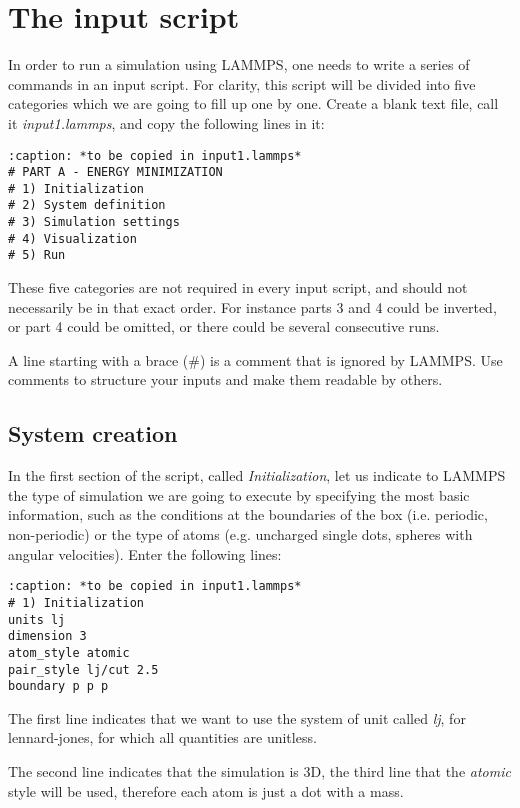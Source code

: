 \section{The input script}

In order to run a simulation using LAMMPS, one needs to
write a series of commands in an input script. For clarity,
this script will be divided into five categories which we are going to
fill up one by one. Create a blank text file, call it
\textit{input1.lammps}, and copy the following lines in it:

\begin{verbatim}
:caption: *to be copied in input1.lammps*
# PART A - ENERGY MINIMIZATION
# 1) Initialization
# 2) System definition
# 3) Simulation settings
# 4) Visualization
# 5) Run
\end{verbatim}

\noindent These five categories are not required in every
input script, and should not necessarily be in that
exact order. For instance parts 3 and 4 could be inverted, or
part 4 could be omitted, or there could be several
consecutive runs.

A line starting with a brace ($\#$) is a comment
that is ignored by LAMMPS. Use comments to structure 
your inputs and make them readable by others.

\subsection{System creation}

In the first section of the script, called \textit{Initialization},
let us indicate to LAMMPS the type of simulation we are
going to execute by specifying the most basic information,
such as the conditions at the boundaries of the box (i.e.
periodic, non-periodic) or the type of atoms (e.g. uncharged
single dots, spheres with angular velocities). Enter the
following lines:

\begin{verbatim}
:caption: *to be copied in input1.lammps*
# 1) Initialization
units lj
dimension 3
atom_style atomic
pair_style lj/cut 2.5
boundary p p p
\end{verbatim}

\noindent The first line indicates that we want to
use the system of unit called \textit{lj}, for lennard-jones, for which all quantities
are unitless. 

The second line indicates that the simulation
is 3D, the third line that the \textit{atomic} style
will be used, therefore each atom is just a dot with a mass.

